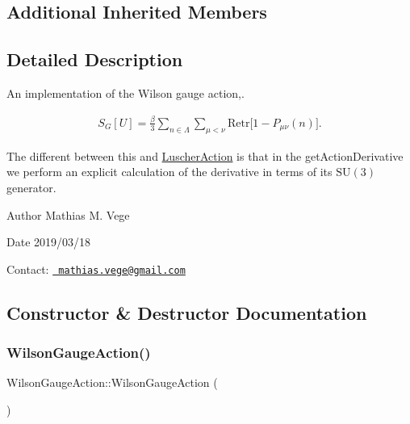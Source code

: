 \subsection*{Additional Inherited Members}


\subsection{Detailed Description}
An implementation of the Wilson gauge action,. 

\begin{eqnarray*} S_G[U] = \frac{\beta}{3} \sum_{n\in\Lambda} \sum_{\mu<\nu} \mathrm{Re} \mathrm{tr} \big[ 1 - P_{\mu\nu}(n) \big]. \end{eqnarray*}

The different between this and \mbox{\hyperlink{class_luscher_action}{Luscher\+Action}} is that in the get\+Action\+Derivative we perform an explicit calculation of the derivative in terms of its $\mathrm{SU}(3)$ generator.

\begin{DoxyAuthor}{Author}
Mathias M. Vege
\end{DoxyAuthor}
\begin{DoxyDate}{Date}
2019/03/18
\end{DoxyDate}
Contact\+: \href{mailto:mathias.vege@gmail.com}{\texttt{ mathias.\+vege@gmail.\+com}} 

\subsection{Constructor \& Destructor Documentation}
\mbox{\label{class_wilson_gauge_action_a50d06446cf93f7e738e88c372920f518}} 
\subsubsection{\texorpdfstring{WilsonGaugeAction()}{WilsonGaugeAction()}}
{\footnotesize\ttfamily Wilson\+Gauge\+Action\+::\+Wilson\+Gauge\+Action (\begin{DoxyParamCaption}{ }\end{DoxyParamCaption})}

